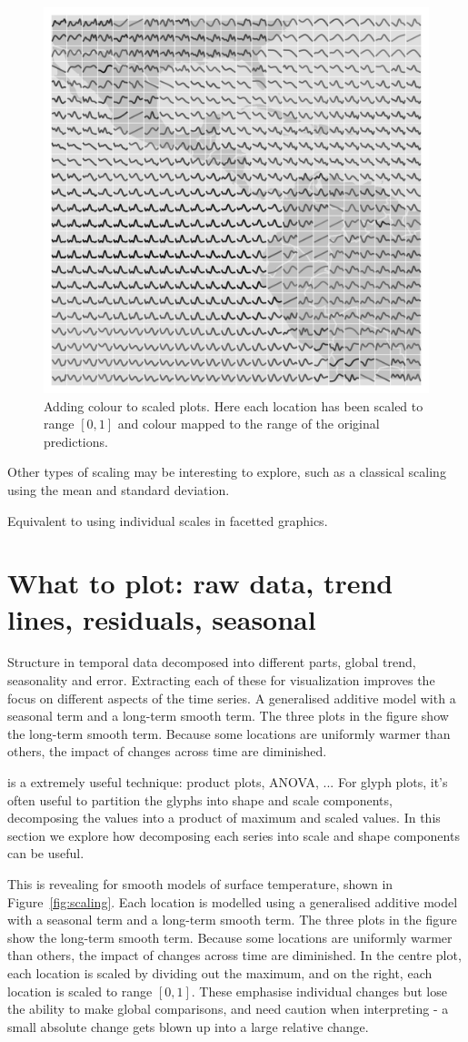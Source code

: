 \documentclass[oneside]{article}
\begin{document}
\begin{figure}[htbp]
  \centering
  \includegraphics[width=0.33\linewidth]{month-rescale01-col}
  \caption{Adding colour to scaled plots. Here each location has been scaled to range $[0, 1]$ and colour mapped to the range of the original predictions.}
  \label{fig:scaling-col}
\end{figure}

Other types of scaling may be interesting to explore, such as a classical scaling using the mean and standard deviation.

Equivalent to using individual scales in facetted graphics. 

\section{What to plot: raw data, trend lines, residuals,  seasonal}

Structure in temporal data decomposed into different parts, global trend, seasonality and error. Extracting each of these for visualization improves the focus on different aspects of the time series. A generalised additive model \citep{wood:2006} with a seasonal term and a long-term smooth term. The three plots in the figure show the long-term smooth term. Because some locations are uniformly warmer than others, the impact of changes across time are diminished.

 is a extremely useful technique: product plots, ANOVA, ...  For glyph plots, it's often useful to partition the glyphs into shape and scale components, decomposing the values into a product of maximum and scaled values.  In this section we explore how decomposing each series into scale and shape components can be useful.

This is revealing for smooth models of surface temperature, shown in Figure~\ref{fig:scaling}. Each location is modelled using a generalised additive model \citep{wood:2006} with a seasonal term and a long-term smooth term. The three plots in the figure show the long-term smooth term. Because some locations are uniformly warmer than others, the impact of changes across time are diminished. In the centre plot, each location is scaled by dividing out the maximum, and on the right, each location is scaled to range $[0, 1]$. These emphasise individual changes but lose the ability to make global comparisons, and need caution when interpreting - a small absolute change gets blown up into a large relative change.
\end{document}
